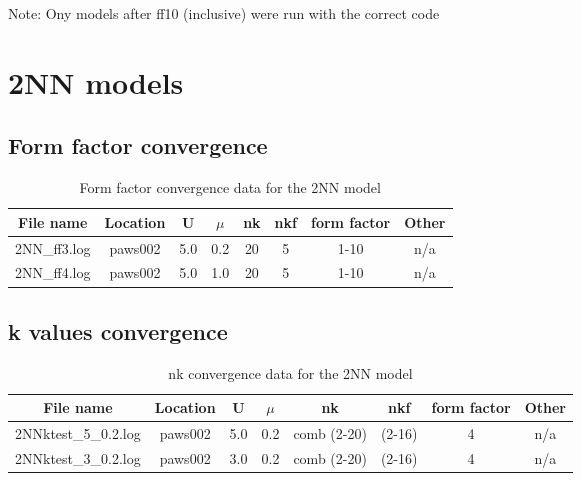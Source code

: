\documentclass{article}
\begin{document}
Note: Ony models after ff10 (inclusive) were run with the correct code 


\section{2NN models}

\subsection{ Form factor convergence}

\begin{table}[h]
    \centering
    \begin{tabular}{|c|c|c|c|c|c|c|c|}
        \hline
        File name & Location & U & $\mu$ &  nk & nkf & form factor & Other \\ \hline
        2NN\_ff3.log &  paws002 & 5.0 & 0.2 & 20 & 5& 1-10 & n/a \\ \hline
        2NN\_ff4.log &  paws002 & 5.0 & 1.0 & 20 & 5& 1-10 & n/a \\ \hline
       
    \end{tabular}
    \caption{Form factor convergence data for the 2NN model}
    \label{tab:example_table}
\end{table}

\subsection{k values convergence}

\begin{table}[h]
    \centering
    \begin{tabular}{|c|c|c|c|c|c|c|c|}
        \hline
        File name & Location & U & $\mu$ &  nk & nkf & form factor & Other \\ \hline
        2NNktest\_5\_0.2.log &  paws002 & 5.0 & 0.2 & comb (2-20) & (2-16)& 4 & n/a \\ \hline
        2NNktest\_3\_0.2.log &  paws002 & 3.0 & 0.2 & comb (2-20) & (2-16)& 4 & n/a \\ \hline
       
    \end{tabular}
    \caption{nk convergence data for the 2NN model}
    \label{tab:example_table}
\end{table}
\end{document}
